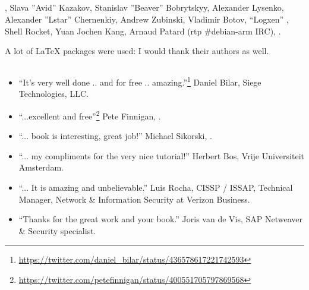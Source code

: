 \subsection*{}

\HERMIT, 
{Slava ''Avid'' Kazakov, Stanislav ''Beaver'' Bobrytskyy, Alexander Lysenko, 
Alexander ''Lstar'' Chernenkiy, Andrew Zubinski, Vladimir Botov},  ``Logxen'' ,
Shell Rocket, Yuan Jochen Kang, Arnaud Patard (rtp  \#debian-arm IRC), 
.

{A lot of \LaTeX{} packages were used: I would thank their authors as well}.

\subsection*{}

\begin{itemize}
\item ``It's very well done .. and for free .. amazing.''\footnote{\url{https://twitter.com/daniel_bilar/status/436578617221742593}} Daniel Bilar, Siege Technologies, LLC.

\item ``...excellent and free''\footnote{\url{https://twitter.com/petefinnigan/status/400551705797869568}} Pete Finnigan, \oracle{}.

\item ``... book is interesting, great job!'' Michael Sikorski,  .

\item ``... my compliments for the very nice tutorial!'' Herbert Bos,  Vrije Universiteit Amsterdam.

\item ``... It is amazing and unbelievable.'' Luis Rocha, CISSP / ISSAP, Technical Manager, Network \& Information Security at Verizon Business.

\item ``Thanks for the great work and your book.'' Joris van de Vis, SAP Netweaver \& Security specialist.

\end{itemize}

